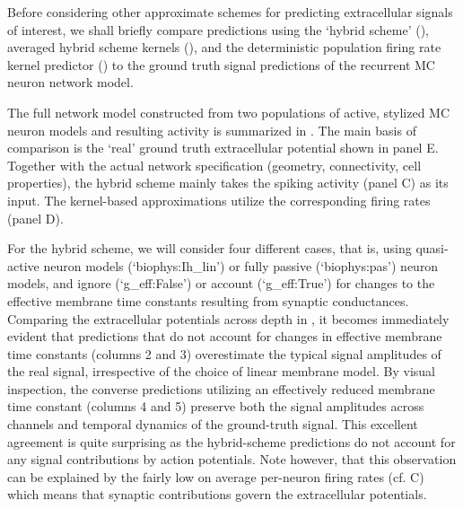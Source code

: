 Before considering other approximate schemes for predicting extracellular signals of interest, 
we shall briefly compare predictions using the `hybrid scheme' (),
averaged hybrid scheme kernels (),
and the deterministic population firing rate kernel predictor () to the ground truth signal predictions of the recurrent MC neuron network model. 

The full network model constructed from two populations of active, stylized MC neuron models and resulting activity is summarized in . 
The main basis of comparison is the `real' ground truth extracellular potential shown in panel E. 
Together with the actual network specification (geometry, connectivity, cell properties), 
the hybrid scheme mainly takes the spiking activity (panel C) as its input. 
The kernel-based approximations utilize the corresponding firing rates (panel D). 

For the hybrid scheme, 
we will consider four different cases, that is, using quasi-active neuron models (`biophys:Ih\_lin') or fully passive (`biophys:pas') neuron models, 
and ignore (`g\_eff:False') or account (`g\_eff:True') for changes to the effective membrane time constants resulting from synaptic conductances.  
Comparing the extracellular potentials across depth in ,
it becomes immediately evident that predictions that do not account for changes in effective membrane time constants (columns 2 and 3) overestimate the typical signal amplitudes of the real signal, 
irrespective of the choice of linear membrane model. 
By visual inspection, the converse predictions utilizing an effectively reduced membrane time constant (columns 4 and 5) preserve both the signal amplitudes across channels and temporal dynamics of the ground-truth signal. 
This excellent agreement is quite surprising as the hybrid-scheme predictions do not account for any signal contributions by action potentials. 
Note however, that this observation can be explained by the fairly low on average per-neuron firing rates (cf. C) which means that synaptic contributions govern the extracellular potentials.

